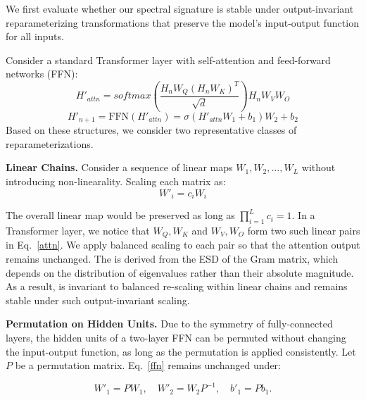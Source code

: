 
We first evaluate whether our spectral signature \ALPHAHILL is stable under output-invariant reparameterizing transformations that preserve the model’s input-output function for all inputs. 

Consider a standard Transformer layer with self-attention and feed-forward networks (FFN):
%
\begin{equation}
H'_{attn}=softmax(\frac{H_n W_Q (H_n W_K)^T}{\sqrt{d}})H_nW_VW_O
\label{attn}
\end{equation}
%
\begin{equation}
    H'_{n+1}= \mathrm{FFN}(H'_{attn}) = \sigma(H'_{attn} W_1 + b_1) W_2 + b_2
    \label{ffn}
\end{equation}
%
Based on these structures, we consider two representative classes of reparameterizations.

\textbf{Linear Chains.}
Consider a sequence of linear maps $W_1, W_2, \dots, W_L$ without introducing non-linearality. Scaling each matrix as: 
\begin{equation}
W'_i = c_i W_i 
\label{eq: randomscale}
\end{equation}

The overall linear map would be preserved as long as $\prod_{i=1}^Lc_i = 1$.
In a Transformer layer, we notice that $W_Q, W_K$ and $W_V, W_O$ form two such linear pairs in Eq.~\ref{attn}. We apply balanced scaling to each pair so that the attention output remains unchanged.
The \ALPHAHILL is derived from the ESD of the Gram matrix, which depends on the distribution of eigenvalues rather than their absolute magnitude. As a result, \ALPHAHILL is invariant to balanced re-scaling within linear chains and remains stable under such output-invariant scaling.

\textbf{Permutation on Hidden Units.}
Due to the symmetry of fully-connected layers, the hidden units of a two-layer FFN can be permuted without changing the input-output function, as long as the permutation is applied consistently. Let $P$ be a permutation matrix. Eq.~\ref{ffn} remains unchanged under:

\[
W'_1 = P W_1, \quad
W'_2 = W_2 P^{-1}, \quad
b'_1 = P b_1 .
\]

